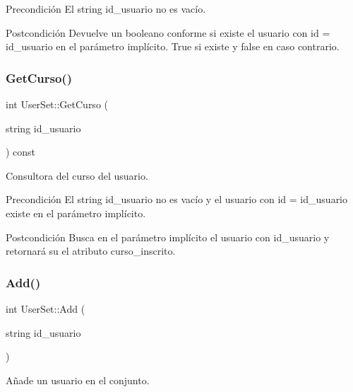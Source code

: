\begin{DoxyPrecond}{Precondición}
El string id\+\_\+usuario no es vacío. 
\end{DoxyPrecond}
\begin{DoxyPostcond}{Postcondición}
Devuelve un booleano conforme si existe el usuario con id = id\+\_\+usuario en el parámetro implícito. True si existe y false en caso contrario. 
\end{DoxyPostcond}
\mbox{\label{class_user_set_a20c73031d173fac4db788598ea20ce79}} 
\subsubsection{\texorpdfstring{Get\+Curso()}{GetCurso()}}
{\footnotesize\ttfamily int User\+Set\+::\+Get\+Curso (\begin{DoxyParamCaption}\item[{string}]{id\+\_\+usuario }\end{DoxyParamCaption}) const}



Consultora del curso del usuario. 

\begin{DoxyPrecond}{Precondición}
El string id\+\_\+usuario no es vacío y el usuario con id = id\+\_\+usuario existe en el parámetro implícito. 
\end{DoxyPrecond}
\begin{DoxyPostcond}{Postcondición}
Busca en el parámetro implícito el usuario con id\+\_\+usuario y retornará su el atributo curso\+\_\+inscrito. 
\end{DoxyPostcond}
\mbox{\label{class_user_set_af0b143d52582d95f08ad92c9eee64394}} 
\subsubsection{\texorpdfstring{Add()}{Add()}}
{\footnotesize\ttfamily int User\+Set\+::\+Add (\begin{DoxyParamCaption}\item[{string}]{id\+\_\+usuario }\end{DoxyParamCaption})}



Añade un usuario en el conjunto. 

